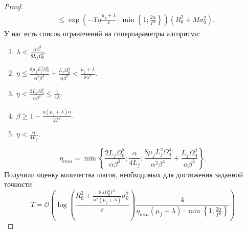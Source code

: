 \begin{proof}
\begin{equation*}
\begin{split}
    &\leq \exp{\left(-T \eta\frac{\mu_f + \lambda}{4} \cdot \min \left\{1; \frac{2\alpha}{\Gamma^2} \right\} \right)}\left( R_0^2 + M\sigma_0^2 \right).
    \end{split}
\end{equation*}
У нас есть список ограничений на гиперпараметры алгоритма:
\begin{enumerate}
    \item $\lambda < \frac{\alpha \beta^2}{8L_f \Omega_0^2}$.
    \item $\eta \leq \frac{8\mu_f L_f^2 \Omega_0^4}{\alpha^2 \beta^4} + \frac{L_f \Omega_0^2}{\alpha \beta^2} < \frac{\mu_f + \lambda}{8\lambda^2}$.
    \item $\eta < \frac{2L_f \Omega_0^2}{\alpha \beta^2} \leq \frac{1}{4\lambda}$.
    \item $\beta \geq 1 - \frac{\eta(\mu_f + \lambda)\alpha}{2 \Gamma^2}$.
    \item $\eta < \frac{\alpha}{4L_f}$.
\end{enumerate}
\begin{equation*}
    \eta_{min} = \min \left\{ \frac{2L_f \Omega_0^2}{\alpha \beta^2}; \frac{\alpha}{4L_f}; \frac{8\mu_f L_f^2 \Omega_0^4}{\alpha^2 \beta^4} + \frac{L_f \Omega_0^2}{\alpha \beta^2} \right\}.
\end{equation*}
Получили оценку количества шагов, необходимых для достижения заданной точности
\begin{equation*}
T = \mathcal{O} \left(\log\left(\frac{R_0^2 + \frac{8\lambda \Omega_0^2 \Gamma^2}{\alpha^2(\mu_f+\lambda)} \sigma_0^2}{\varepsilon} \right) \frac{4}{\eta_{min} (\mu_f + \lambda)\cdot \min \left\{1; \frac{2\alpha}{\Gamma^2} \right\} } \right)    
\end{equation*}
\end{proof}
